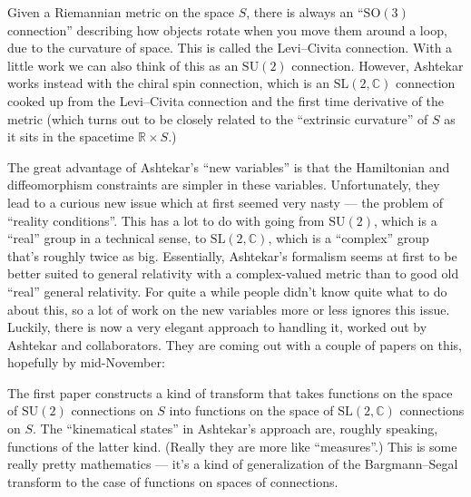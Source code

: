 \documentclass[12pt]{article}
\renewcommand{\texttt}[1]{%
  \begingroup
  \ttfamily
  \begingroup\lccode`~=`/\lowercase{\endgroup\def~}{/\discretionary{}{}{}}%
  \begingroup\lccode`~=`[\lowercase{\endgroup\def~}{[\discretionary{}{}{}}%
  \begingroup\lccode`~=`.\lowercase{\endgroup\def~}{.\discretionary{}{}{}}%
  \catcode`/=\active\catcode`[=\active\catcode`.=\active
  \scantokens{#1\noexpand}%
  \endgroup
}
\begin{document}
Given a Riemannian metric on the space \(S\), there is always an
``\(\mathrm{SO}(3)\) connection'' describing how objects rotate when you
move them around a loop, due to the curvature of space. This is called
the Levi--Civita connection. With a little work we can also think of this
as an \(\mathrm{SU}(2)\) connection. However, Ashtekar works instead
with the chiral spin connection, which is an
\(\mathrm{SL}(2,\mathbb{C})\) connection cooked up from the Levi--Civita
connection and the first time derivative of the metric (which turns out
to be closely related to the ``extrinsic curvature'' of \(S\) as it sits
in the spacetime \(\mathbb{R} \times S\).)

The great advantage of Ashtekar's ``new variables'' is that the
Hamiltonian and diffeomorphism constraints are simpler in these
variables. Unfortunately, they lead to a curious new issue which at
first seemed very nasty --- the problem of ``reality conditions''. This
has a lot to do with going from \(\mathrm{SU}(2)\), which is a ``real''
group in a technical sense, to \(\mathrm{SL}(2,\mathbb{C})\), which is a
``complex'' group that's roughly twice as big. Essentially, Ashtekar's
formalism seems at first to be better suited to general relativity with
a complex-valued metric than to good old ``real'' general relativity.
For quite a while people didn't know quite what to do about this, so a
lot of work on the new variables more or less ignores this issue.
Luckily, there is now a very elegant approach to handling it, worked out
by Ashtekar and collaborators. They are coming out with a couple of
papers on this, hopefully by mid-November:

\noindent
The first paper constructs a kind of transform that takes functions on
the space of \(\mathrm{SU}(2)\) connections on \(S\) into functions on
the space of \(\mathrm{SL}(2,\mathbb{C})\) connections on \(S\). The
``kinematical states'' in Ashtekar's approach are, roughly speaking,
functions of the latter kind. (Really they are more like ``measures''.)
This is some really pretty mathematics --- it's a kind of generalization
of the Bargmann--Segal transform to the case of functions on spaces of
connections.
\end{document}
